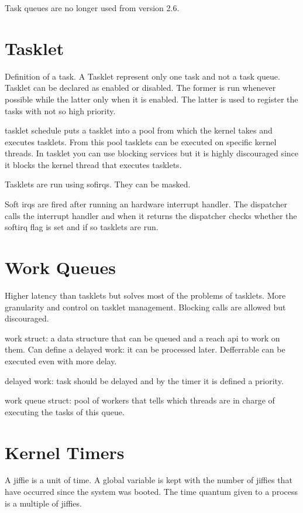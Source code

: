 \documentclass[twoside]{article}
\begin{document}
Task queues are no longer used from version 2.6.


\section{Tasklet}
\label{sec:Tasklet}

Definition of a task. A Tasklet represent only one task and not a task queue.
Tasklet can be declared as enabled or disabled. The former is run whenever
possible while the latter only when it is enabled. The latter is used to
register the tasks with not so high priority.


tasklet schedule puts a tasklet into a pool from which the kernel takes and
executes tasklets. From this pool tasklets can be executed on specific kernel
threads. In tasklet you can use blocking services but it is highly discouraged
since it blocks the kernel thread that executes tasklets.


Tasklets are run using sofirqs. They can be masked.


Soft irqs are fired after running an hardware interrupt handler. The dispatcher
calls the interrupt handler and when it returns the dispatcher checks whether
the softirq flag is set and if so tasklets are run.


\section{Work Queues}
\label{sec:Work Queues}

Higher latency than tasklets but solves most of the problems of tasklets. More
granularity and control on tasklet management. Blocking calls are allowed but
discouraged.

work struct: a data structure that can be queued and a reach api to work on
them. Can define a delayed work: it can be processed later. Defferrable can be
executed even with more delay.


delayed work: task should be delayed and by the timer it is defined a priority.

work queue struct: pool of workers that tells which threads are in charge of
executing the tasks of this queue.


\section{Kernel Timers}
\label{sec:Kernel Timers}

A jiffie is a unit of time. A global variable is kept with the number of
jiffies that have occurred since the system was booted.
The time quantum given to a process is a multiple of jiffies. 
\end{document}
